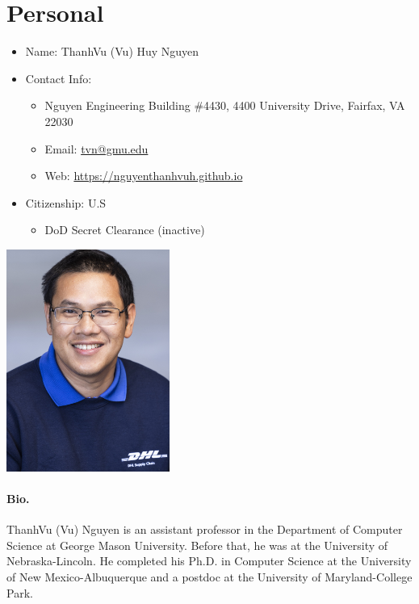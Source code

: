 \documentclass[11pt]{article}
\makeatletter
\newcommand{\myname}{ThanhVu (Vu) Huy Nguyen}
\newcommand{\mynamevn}{Nguy$\tilde{\hat{\text{e}}}$n Huy ThanhV$\tilde{\text{u}}$}
\newcommand{\myemailwork}{tvn@gmu.edu}
\newcommand{\myweb}{https://nguyenthanhvuh.github.io}
\newcommand{\emailweb}{
\item Email: \href{mailto:\myemailwork}{\myemailwork}
\item Web: \url{\myweb}
}
\makeatother
\begin{document}
{
  \section{Personal}

  \begin{minipage}{.8\textwidth}
    \begin{itemize}
    \item Name: \myname{}
    \item Contact Info:
      \begin{itemize}
        \item Nguyen Engineering Building \#4430, 4400 University Drive, Fairfax, VA 22030
        \emailweb{}
      \end{itemize}
    \item Citizenship: U.S
      \begin{itemize}
      \item DoD Secret Clearance (inactive)
      \end{itemize}
    \end{itemize}
  \end{minipage}
  \begin{minipage}{.3\textwidth}
    \includegraphics[width=0.4\textwidth]{tvn.png}
  \end{minipage}

  \paragraph{Bio.}  ThanhVu (Vu) Nguyen is an assistant professor in the Department of
  Computer Science at George Mason University. Before that, he was at the University of Nebraska-Lincoln.  He completed his Ph.D. in Computer Science at the University of New Mexico-Albuquerque and a postdoc at the University of Maryland-College Park.
  
}
\end{document}
